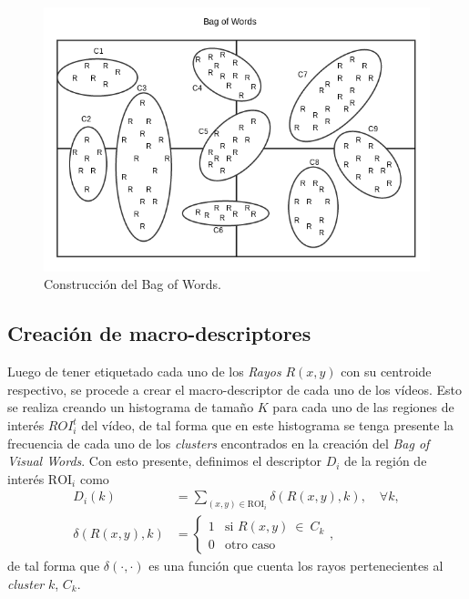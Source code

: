 	\begin{figure}[tb]
		\centering
    		\includegraphics[width=1\textwidth]{Figuras/Diagramas/bow_solo.png}
  		\caption{Construcción del Bag of Words.}
  		\label{algoritmo:fig:bow}
	\end{figure}	

	\subsection{Creación de macro-descriptores}
	\label{algoritmo:crea_macro-descriptores}
	Luego de tener etiquetado cada uno de los \textit{Rayos} $R(x,y)$ con su centroide respectivo, se procede a crear el macro-descriptor de cada uno de los vídeos.	 Esto se realiza creando un histograma de tamaño $K$ para cada uno de las regiones de interés ${ROI}_{i}^{t}$ del vídeo, de tal forma que en este histograma se tenga presente la frecuencia de cada uno de los \textit{clusters} encontrados en la creación del \textit{Bag of Visual Words}. Con esto presente, definimos el descriptor $D_i$ de la región de interés $\text{ROI}_i$ como
	\begin{align}
		\label{algoritmo:eq:hist}
		D_i(k) &= \sum_{(x,y)\in \text{ROI}_i} \delta (R(x,y),k), \quad \forall k,\\
		\label{algoritmo:eq:fun_hist}
		 \delta (R(x,y),k) &= \begin{cases}
		 1 & \mbox{si }R(x,y)~\in~C_k\\
     0 & \text{otro caso}
     \end{cases},
	\end{align}
de tal forma que $\delta(\cdot,\cdot)$ es una función que cuenta los rayos pertenecientes al \textit{cluster} $k$, $C_k$.

